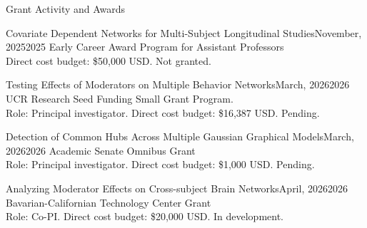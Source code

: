 \documentclass{resume_customized} %
\begin{document}
\begin{rSection}{Grant Activity and Awards}
	
	
	\begin{rSubsection}{Covariate Dependent Networks for Multi-Subject Longitudinal Studies}{November, 2025}{2025 Early Career Award Program for Assistant Professors\\ Direct cost budget: \$50,000 USD. Not granted.}
		
	\end{rSubsection}
	
	
	\begin{rSubsection}{Testing Effects of Moderators on Multiple Behavior Networks}{March, 2026}{2026 UCR Research Seed Funding Small Grant Program. \\ Role: Principal investigator. Direct cost budget: \$16,387 USD. Pending.}
		
	\end{rSubsection}
	
	\begin{rSubsection}{Detection of Common Hubs Across Multiple Gaussian Graphical Models}{March, 2026}{2026 Academic Senate Omnibus Grant \\Role: Principal investigator. Direct cost budget: \$1,000 USD. Pending.}
	
	\end{rSubsection}
	
	
	\begin{rSubsection}{Analyzing Moderator Effects on Cross-subject Brain Networks}{April, 2026}{2026 Bavarian-Californian Technology Center Grant\\Role: Co-PI. Direct cost budget: \$20,000 USD. In development.}
		
	\end{rSubsection}
	

	
	
	
\end{rSection}
\end{document}
